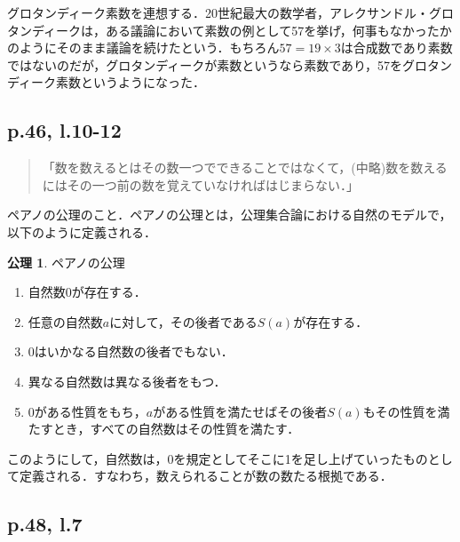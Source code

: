 \documentclass[10pt, a5paper, twoside]{jsarticle}
\theoremstyle{definition}
\newtheorem{axi}{公理}
\begin{document}
			グロタンディーク素数を連想する．20世紀最大の数学者，アレクサンドル・グロタンディークは，ある議論において素数の例として57を挙げ，何事もなかったかのようにそのまま議論を続けたという．もちろん$57 = 19 \times 3$は合成数であり素数ではないのだが，グロタンディークが素数というなら素数であり，57をグロタンディーク素数というようになった．

		\subsection{p.46, l.10-12}

			\begin{quote}
				
				「数を数えるとはその数一つでできることではなくて，(中略)数を数えるにはその一つ前の数を覚えていなければはじまらない．」

			\end{quote}

			ペアノの公理のこと．ペアノの公理とは，公理集合論における自然のモデルで，以下のように定義される．

			\begin{axi}

				ペアノの公理

				\begin{enumerate}
					\item 自然数$0$が存在する．

					\item 任意の自然数$a$に対して，その後者である$S(a)$が存在する．

					\item $0$はいかなる自然数の後者でもない．

					\item 異なる自然数は異なる後者をもつ．

					\item $0$がある性質をもち，$a$がある性質を満たせばその後者$S(a)$もその性質を満たすとき，すべての自然数はその性質を満たす．
				\end{enumerate}
				
			\end{axi}

			このようにして，自然数は，0を規定としてそこに1を足し上げていったものとして定義される．すなわち，数えられることが数の数たる根拠である．

		\subsection{p.48, l.7}
\end{document}

